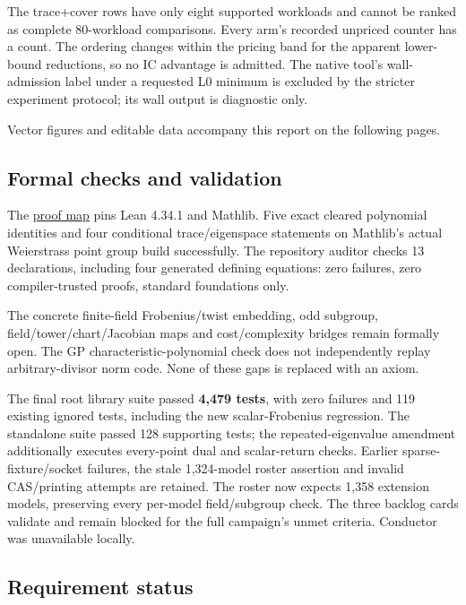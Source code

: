 \documentclass[
  10pt,
]{article}
\begin{document}
The trace+cover rows have only eight supported workloads and cannot be
ranked as complete 80-workload comparisons. Every arm's recorded
unpriced counter has a count. The ordering changes within the pricing
band for the apparent lower-bound reductions, so no IC advantage is
admitted. The native tool's wall-admission label under a requested L0
minimum is excluded by the stricter experiment protocol; its wall output
is diagnostic only.

Vector figures and editable data accompany this report on the following pages.

\subsection{Formal checks and
validation}\label{formal-checks-and-validation}

The \href{../lean/README.md}{proof map} pins Lean 4.34.1 and Mathlib.
Five exact cleared polynomial identities and four conditional
trace/eigenspace statements on Mathlib's actual Weierstrass point group
build successfully. The repository auditor checks 13 declarations,
including four generated defining equations: zero failures, zero
compiler-trusted proofs, standard foundations only.

The concrete finite-field Frobenius/twist embedding, odd subgroup,
field/tower/chart/Jacobian maps and cost/complexity bridges remain
formally open. The GP characteristic-polynomial check does not
independently replay arbitrary-divisor norm code. None of these gaps is
replaced with an axiom.

The final root library suite passed \textbf{4,479 tests}, with zero
failures and 119 existing ignored tests, including the new
scalar-Frobenius regression. The standalone suite passed 128 supporting
tests; the repeated-eigenvalue amendment additionally executes
every-point dual and scalar-return checks. Earlier sparse-fixture/socket
failures, the stale 1,324-model roster assertion and invalid
CAS/printing attempts are retained. The roster now expects 1,358
extension models, preserving every per-model field/subgroup check. The
three backlog cards validate and remain blocked for the full campaign's
unmet criteria. Conductor was unavailable locally.

\subsection{Requirement status}\label{requirement-status}
\end{document}
